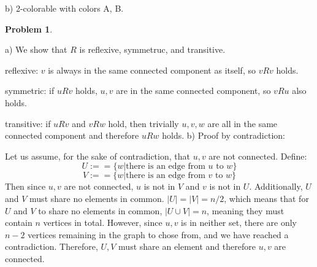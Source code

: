 \documentclass{amsart}
\theoremstyle{definition}
\newtheorem{problem}{Problem}
\theoremstyle{remark}
\begin{document}
b) 2-colorable with colors A, B.

\begin{problem}
\end{problem}
a) We show that $R$ is reflexive, symmetruc, and transitive.

reflexive: $v$ is always in the same connected component as itself, so $vRv$ holds.

symmetric: if $uRv$ holds, $u,v$ are in the same connected component, so $vRu$ also holds.

transitive: if $uRv$ and $vRw$ hold, then trivially $u,v,w$ are all in the same connected component and therefore $uRw$ holds.
\newline
\newline
b) Proof by contradiction:

Let us assume, for the sake of contradiction, that $u,v$ are not connected. Define:
\[
U:==\{ w | \text{there is an edge from $u$ to $w$}\}
\]
\[
V:==\{ w | \text{there is an edge from $v$ to $w$}\}
\]
Then since $u,v$ are not connected, $u$ is not in $V$ and $v$ is not in $U$.  Additionally, $U$ and $V$ must share no elements in common.  $|U|=|V|=n/2$, which means that for $U$ and $V$ to share no elements in common, $|U\cup V|=n$, meaning they must contain $n$ vertices in total.  However, since $u,v$ is in neither set, there are only $n-2$ vertices remaining in the graph to chose from, and we have reached a contradiction.  Therefore, $U,V$ must share an element and therefore $u,v$ are connected.
\end{document}
